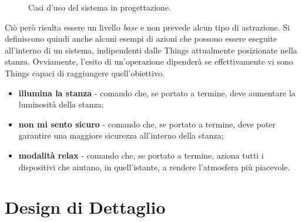 \documentclass[12pt,a4paper,openright,oneside]{report}
\begin{document}
\begin{figure}[h]
	\centering
	\caption{Casi d'uso del sistema in progettazione.}
	\label{fig:use-case}
\end{figure}

Ciò però risulta essere un livello \textit{base} e non prevede alcun tipo di astrazione. Si definiscono quindi anche alcuni esempi di azioni che possono essere eseguite all'interno di un sistema, indipendenti dalle Things attualmente posizionate nella stanza. Ovviamente, l'esito di un'operazione dipenderà se effettivamente vi sono Things capaci di raggiungere quell'obiettivo.

\begin{itemize}
	\item \textbf{illumina la stanza} - comando che, se portato a termine, deve aumentare la luminosità della stanza;
	\item \textbf{non mi sento sicuro} - comando che, se portato a termine, deve poter garantire una maggiore sicurezza all'interno della stanza;
	\item \textbf{modalità relax} - comando che, se portato a termine, aziona tutti i dispositivi che aiutano, in quell'istante, a rendere l'atmosfera più piacevole.
\end{itemize}

\section{Design di Dettaglio}
\end{document}
